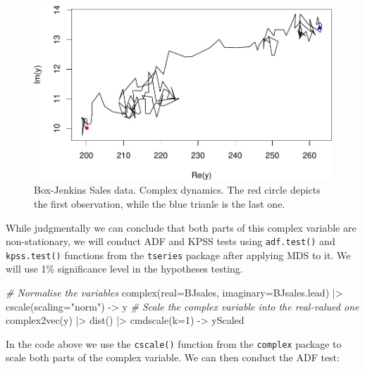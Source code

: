 \documentclass[
]{book}
\newenvironment{Shaded}{\begin{snugshade}}{\end{snugshade}}
\newcommand{\AttributeTok}[1]{\textcolor[rgb]{0.77,0.63,0.00}{#1}}
\newcommand{\CommentTok}[1]{\textcolor[rgb]{0.56,0.35,0.01}{\textit{#1}}}
\newcommand{\DecValTok}[1]{\textcolor[rgb]{0.00,0.00,0.81}{#1}}
\newcommand{\FunctionTok}[1]{\textcolor[rgb]{0.00,0.00,0.00}{#1}}
\newcommand{\NormalTok}[1]{#1}
\newcommand{\OtherTok}[1]{\textcolor[rgb]{0.56,0.35,0.01}{#1}}
\newcommand{\SpecialCharTok}[1]{\textcolor[rgb]{0.00,0.00,0.00}{#1}}
\newcommand{\StringTok}[1]{\textcolor[rgb]{0.31,0.60,0.02}{#1}}
\begin{document}
\begin{figure}
\centering
\includegraphics{Svetunkov---Svetunkov---Complex-Valued-Econometrics_files/figure-latex/BJSalesComplex-1.pdf}
\caption{\label{fig:BJSalesComplex}Box-Jenkins Sales data. Complex dynamics. The red circle depicts the first observation, while the blue trianle is the last one.}
\end{figure}

While judgmentally we can conclude that both parts of this complex variable are non-stationary, we will conduct ADF and KPSS tests using \texttt{adf.test()} and \texttt{kpss.test()} functions from the \texttt{tseries} package after applying MDS to it. We will use 1\% significance level in the hypotheses testing.

\begin{Shaded}
\begin{Highlighting}[]
\CommentTok{\# Normalise the variables}
\FunctionTok{complex}\NormalTok{(}\AttributeTok{real=}\NormalTok{BJsales, }\AttributeTok{imaginary=}\NormalTok{BJsales.lead) }\SpecialCharTok{|\textgreater{}}
    \FunctionTok{cscale}\NormalTok{(}\AttributeTok{scaling=}\StringTok{"norm"}\NormalTok{) }\OtherTok{{-}\textgreater{}}\NormalTok{ y}
\CommentTok{\# Scale the complex variable into the real{-}valued one}
\FunctionTok{complex2vec}\NormalTok{(y) }\SpecialCharTok{|\textgreater{}} \FunctionTok{dist}\NormalTok{() }\SpecialCharTok{|\textgreater{}} \FunctionTok{cmdscale}\NormalTok{(}\AttributeTok{k=}\DecValTok{1}\NormalTok{) }\OtherTok{{-}\textgreater{}}\NormalTok{ yScaled}
\end{Highlighting}
\end{Shaded}

In the code above we use the \texttt{cscale()} function from the \texttt{complex} package to scale both parts of the complex variable. We can then conduct the ADF test:
\end{document}
